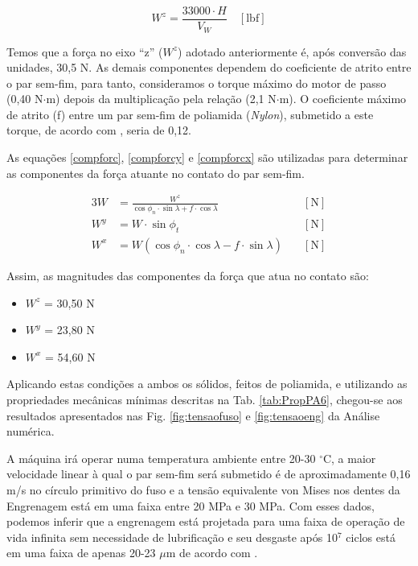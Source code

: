 \begin{equation}
    \label{eqpotenciaeng}
    W^z = \frac{33000 \cdot H}{V_W} \quad [\text{lbf}]
\end{equation}

Temos que a força no eixo “z” ($W^z$) adotado anteriormente é, após conversão das unidades, 30,5 N. As demais componentes dependem do coeficiente de atrito entre o par sem-fim, para tanto, consideramos o torque máximo do motor de passo (0,40 N$\cdot$m) depois da multiplicação pela relação (2,1 N$\cdot$m). O coeficiente máximo de atrito (f) entre um par sem-fim de poliamida (\textit{Nylon}), submetido a este torque, de acordo com \cite{starzhinsky2013}, seria de 0,12. 

As equações \ref{compforc},  \ref{compforcy} e \ref{compforcx} são utilizadas para determinar as componentes da força atuante no contato do par sem-fim.

\begin{alignat}{3}
    \label{compforc}
    W & = \frac{W^z}{\cos{\phi_n}\cdot\sin{\lambda}+f\cdot \cos{\lambda}} & \quad [\text{N}] \\
    \label{compforcy}
    W^y & = W \cdot \sin{\phi_t} & \quad [\text{N}] \\
    \label{compforcx}
    W^x & = W (\cos{\phi_n} \cdot \cos{\lambda} - f \cdot \sin{\lambda}) & \quad [\text{N}]
\end{alignat}

Assim, as magnitudes das componentes da força que atua no contato são:

\begin{itemize}
    \item $W^z$ = 30,50 N
    \item $W^y$ = 23,80 N
    \item $W^x$ = 54,60 N
\end{itemize} 

Aplicando estas condições a ambos os sólidos, feitos de poliamida, e utilizando as propriedades mecânicas mínimas descritas na Tab. \ref{tab:PropPA6}, chegou-se aos resultados apresentados nas Fig. \ref{fig:tensaofuso} e \ref{fig:tensaoeng} da Análise numérica.

A máquina irá operar numa temperatura ambiente entre 20-30 $^{\circ}$C, a maior velocidade linear à qual o par sem-fim será submetido é de aproximadamente 0,16 m/s no círculo primitivo do fuso e a tensão equivalente von Mises nos dentes da Engrenagem está em uma faixa entre 20 MPa e 30 MPa. Com esses dados, podemos inferir que a engrenagem está projetada para uma faixa de operação de vida infinita sem necessidade de lubrificação e seu desgaste após 10$^7$ ciclos está em uma faixa de apenas 20-23 $\mu$m de acordo com \cite{starzhinsky2013}.

